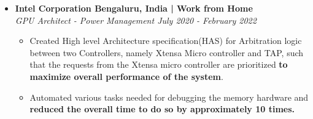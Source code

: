 \documentclass[a4paper,11pt]{article}
\newcommand{\isep}{-2 pt}
\newcommand{\spsep}{-0.75cm}
\begin{document}
\begin{itemize}
	\item \textbf{Intel Corporation \hfill Bengaluru, India | Work from Home} \\
	\emph{GPU Architect - Power Management \hfill July 2020 - February 2022} \\[\spsep]
		\begin{itemize} \itemsep \isep
			\item Created High level Architecture specification(HAS) for Arbitration logic between two Controllers, namely Xtensa Micro controller and TAP, such that the requests from the Xtensa micro controller are prioritized \textbf{to maximize overall performance of the system}.
			\item Automated various tasks needed for debugging the memory hardware and \textbf{reduced the overall time to do so by approximately 10 times.}
		\end{itemize}


\end{itemize}
\end{document}
